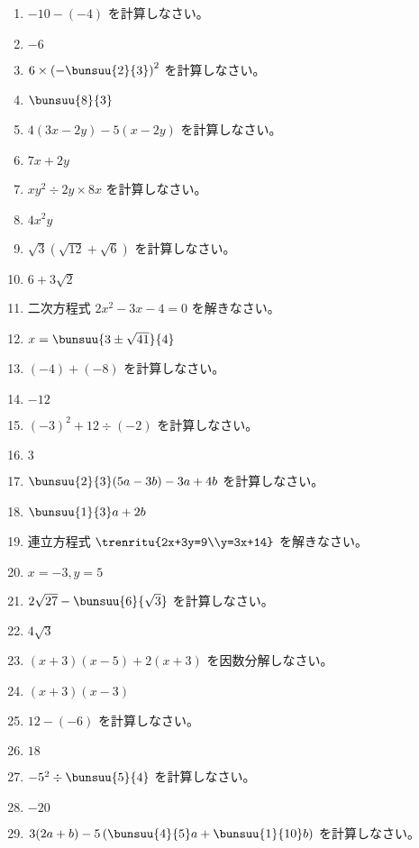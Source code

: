 \documentclass[uplatex,a4j,11pt]{jsreport}
\begin{document}
\begin{multicols}{2}
\begin{enumerate}
    \item $-10-(-4)$ を計算しなさい。%
    \item $-6$
    \item $6\times \left(-\bunsuu{2}{3}\right)^2$ を計算しなさい。%
    \item $\bunsuu{8}{3}$
    \item $4(3x-2y)-5(x-2y)$ を計算しなさい。%
    \item $7x+2y$
    \item $xy^2\div 2y\times 8x$ を計算しなさい。%
    \item $4x^2y$
    \item $\sqrt{3}(\sqrt{12}+\sqrt{6})$ を計算しなさい。%
    \item $6+3\sqrt{2}$
    \item 二次方程式 $2x^2-3x-4=0$ を解きなさい。%
    \item $x=\bunsuu{3\pm\sqrt{41}}{4}$
    \item $(-4)+(-8)$ を計算しなさい。%
    \item $-12$
    \item $(-3)^2+12\div (-2)$ を計算しなさい。%
    \item $3$
    \item $\bunsuu{2}{3}(5a-3b)-3a+4b$ を計算しなさい。%
    \item $\bunsuu{1}{3}a+2b$
    \item 連立方程式 $\trenritu{2x+3y=9\\y=3x+14}$ を解きなさい。%
    \item $x=-3, y=5$
    \item $2\sqrt{27}-\bunsuu{6}{\sqrt{3}}$ を計算しなさい。%
    \item $4\sqrt{3}$
    \item $(x+3)(x-5)+2(x+3)$ を因数分解しなさい。%
    \item $(x+3)(x-3)$
    \item $12-(-6)$ を計算しなさい。%
    \item $18$
    \item $-5^2\div \bunsuu{5}{4}$ を計算しなさい。%
    \item $-20$
    \item $3(2a+b)-5\left(\bunsuu{4}{5}a+\bunsuu{1}{10}b\right)$ を計算しなさい。%

\end{enumerate}
\end{multicols}
\end{document}
